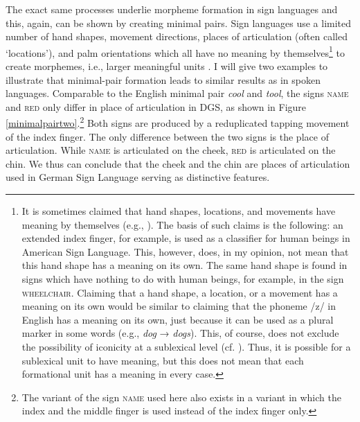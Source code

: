 The exact same processes underlie morpheme formation in sign languages and this, again, can be shown by creating minimal pairs. Sign languages use a limited number of hand shapes, movement directions, places of articulation (often called `locations'), and palm orientations which all have no meaning by themselves\footnote{ It is sometimes claimed that hand shapes, locations, and movements have meaning by themselves (e.g., \citealt[943]{sandler2009sign}). The basis of such claims is the following: an extended index finger, for example, is used as a classifier for human beings in American Sign Language. This, however, does, in my opinion, not mean that this hand shape has a meaning on its own. The same hand shape is found in signs which have nothing to do with human beings, for example, in the sign \textsc{wheelchair}. Claiming that a hand shape, a location, or a movement has a meaning on its own would be similar to claiming that the phoneme /z/ in English has a meaning on its own, just because it can be used as a plural marker in some words (e.g., \textit{dog} → \textit{dogs}). This, of course, does not exclude the possibility of iconicity at a sublexical level (cf. \citealt{kooij2002phonological,zwitserlood2008morphologybelow}). Thus, it is possible for a sublexical unit to have meaning, but this does not mean that each formational unit has a meaning in every case.} to create morphemes, i.e., larger meaningful units \citep{stokoe1960sign, battison1978}. I will give two examples to illustrate that minimal-pair formation leads to similar results as in spoken languages. Comparable to the English minimal pair \textit{cool} and \textit{tool}, the signs \textsc{name} and \textsc{red} only differ in place of articulation in DGS, as shown in Figure \ref{minimalpairtwo}.\footnote{ The variant of the sign \textsc{name} used here also exists in a variant in which the index and the middle finger is used instead of the index finger only.} Both signs are produced by a reduplicated tapping movement of the index finger. The only difference between the two signs is the place of articulation. While \textsc{name} is articulated on the cheek, \textsc{red} is articulated on the chin. We thus can conclude that the cheek and the chin are places of articulation used in German Sign Language serving as distinctive features. 

